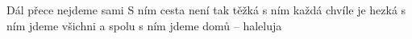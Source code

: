 \begin{TEXT}{Dál přece nejdeme sami}
\SLOKA \hspace{0em} \hspace*{0.6\textwidth}\NL
\hspace{0em} \hspace*{0.6\textwidth}\NL
\hspace{0em} \hspace*{0.6\textwidth}\NL
\hspace{0em} \hspace*{0.6\textwidth}
\SLOKA S ním cesta není tak těžká \NL
s ním každá chvíle je hezká \NL
s ním jdeme všichni a spolu \NL
s ním jdeme domů -- haleluja 
\end{TEXT}

